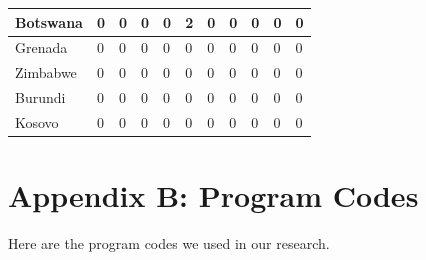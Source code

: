 \documentclass[12pt]{article}  %
\begin{document}
\begin{subappendices}
\begin{longtable}{|l|l|l|l|l|l|l|l|l|l|l|}
	\hline
	Botswana                                                       & 0                                                 & 0                                                 & 0                                                 & 0                                                 & 2                                                 & 0                                                 & 0    & 0      & 0      & 0      \\ 
	\hline
	Grenada                                                        & 0                                                 & 0                                                 & 0                                                 & 0                                                 & 0                                                 & 0                                                 & 0    & 0      & 0      & 0      \\ 
	\hline
	Zimbabwe                                                       & 0                                                 & 0                                                 & 0                                                 & 0                                                 & 0                                                 & 0                                                 & 0    & 0      & 0      & 0      \\ 
	\hline
	Burundi                                                        & 0                                                 & 0                                                 & 0                                                 & 0                                                 & 0                                                 & 0                                                 & 0    & 0      & 0      & 0      \\ 
	\hline
	Kosovo                                                         & 0                                                 & 0                                                 & 0                                                 & 0                                                 & 0                                                 & 0                                                 & 0    & 0      & 0      & 0      \\
	\hline
\end{longtable}


\section{Appendix B: Program Codes}
Here are the program codes we used in our research.


\end{subappendices}
\end{document}
